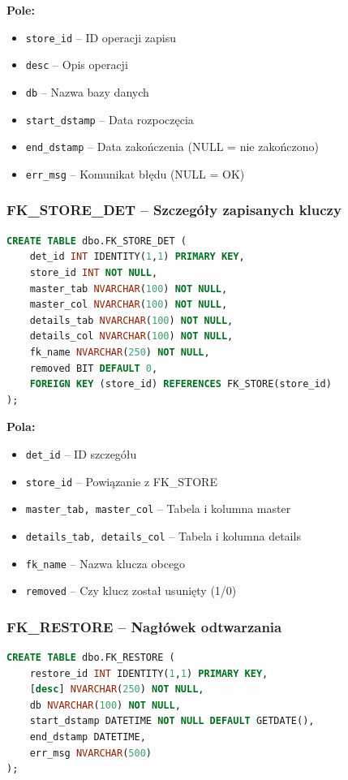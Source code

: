 \documentclass[a4paper,11pt]{article}
\begin{document}
	\textbf{Pole:}
	\begin{itemize}
		\item \texttt{store\_id} -- ID operacji zapisu
		\item \texttt{desc} -- Opis operacji
		\item \texttt{db} -- Nazwa bazy danych
		\item \texttt{start\_dstamp} -- Data rozpoczęcia
		\item \texttt{end\_dstamp} -- Data zakończenia (NULL = nie zakończono)
		\item \texttt{err\_msg} -- Komunikat błędu (NULL = OK)
	\end{itemize}
	
	\subsubsection{FK\_STORE\_DET -- Szczegóły zapisanych kluczy}
	
	\begin{lstlisting}[language=SQL]
CREATE TABLE dbo.FK_STORE_DET (
	det_id INT IDENTITY(1,1) PRIMARY KEY,
	store_id INT NOT NULL,
	master_tab NVARCHAR(100) NOT NULL,
	master_col NVARCHAR(100) NOT NULL,
	details_tab NVARCHAR(100) NOT NULL,
	details_col NVARCHAR(100) NOT NULL,
	fk_name NVARCHAR(250) NOT NULL,
	removed BIT DEFAULT 0,
	FOREIGN KEY (store_id) REFERENCES FK_STORE(store_id)
);
	\end{lstlisting}
	
	\textbf{Pola:}
	\begin{itemize}
		\item \texttt{det\_id} -- ID szczegółu
		\item \texttt{store\_id} -- Powiązanie z FK\_STORE
		\item \texttt{master\_tab, master\_col} -- Tabela i kolumna master
		\item \texttt{details\_tab, details\_col} -- Tabela i kolumna details
		\item \texttt{fk\_name} -- Nazwa klucza obcego
		\item \texttt{removed} -- Czy klucz został usunięty (1/0)
	\end{itemize}
	
	\subsubsection{FK\_RESTORE -- Nagłówek odtwarzania}
	
	\begin{lstlisting}[language=SQL]
CREATE TABLE dbo.FK_RESTORE (
	restore_id INT IDENTITY(1,1) PRIMARY KEY,
	[desc] NVARCHAR(250) NOT NULL,
	db NVARCHAR(100) NOT NULL,
	start_dstamp DATETIME NOT NULL DEFAULT GETDATE(),
	end_dstamp DATETIME,
	err_msg NVARCHAR(500)
);
	\end{lstlisting}
	
\end{document}
